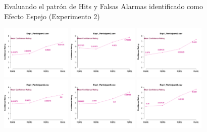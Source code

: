 \begin{figure}[th]
\caption[Rate_Exp2]{Evaluando el patrón de Hits y Falsas Alarmas identificado como Efecto Espejo (Experimento 2)}
\label{fig:Rate_E2}
\end{figure}

\begin{figure}[th]
\centering
\includegraphics[width=0.30\textwidth]{Figures/MirrorRating_Exp1_P1} \includegraphics[width=0.30\textwidth]{Figures/MirrorRating_Exp1_P2} \includegraphics[width=0.30\textwidth]{Figures/MirrorRating_Exp1_P3}
\includegraphics[width=0.30\textwidth]{Figures/MirrorRating_Exp1_P4} \includegraphics[width=0.30\textwidth]{Figures/MirrorRating_Exp1_P5} \includegraphics[width=0.30\textwidth]{Figures/MirrorRating_Exp1_P6}

\end{figure}

